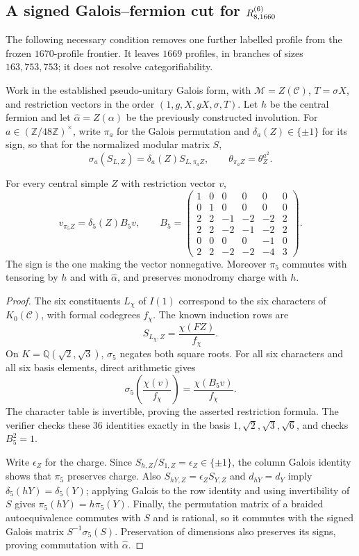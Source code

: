 \subsection{A signed Galois--fermion cut for \texorpdfstring{$R^{(6)}_{8,1660}$}{R6\_8\_1660}}
\label{subsec:r1660-signed-galois}
The following necessary condition removes one further labelled profile from
 the frozen $1670$-profile frontier.  It leaves $1669$ profiles, in branches
of sizes $163,753,753$; it does not resolve categorifiability.

Work in the established pseudo-unitary Galois form, with
$\mathcal M=Z(\mathcal C)$, $T=\sigma X$, and restriction vectors in the
order $(1,g,X,gX,\sigma,T)$.  Let $h$ be the central fermion and let
$\widehat\alpha=Z(\alpha)$ be the previously constructed involution.
For $a\in(\mathbb Z/48\mathbb Z)^\times$, write $\pi_a$ for the Galois
permutation and $\delta_a(Z)\in\{\pm1\}$ for its sign, so that for the
normalized modular matrix $S$,
\[
 \sigma_a(S_{L,Z})=\delta_a(Z)S_{L,\pi_a Z},
 \qquad \theta_{\pi_a Z}=\theta_Z^{a^2}.
\]

\begin{lemma}
For every central simple $Z$ with restriction vector $v$,
\[
 v_{\pi_5 Z}=\delta_5(Z)B_5v,\qquad
 B_5=\begin{pmatrix}
1&0&0&0&0&0\\
0&1&0&0&0&0\\
2&2&-1&-2&-2&2\\
2&2&-2&-1&-2&2\\
0&0&0&0&-1&0\\
2&2&-2&-2&-4&3
\end{pmatrix}.
\]
The sign is the one making the vector nonnegative.  Moreover $\pi_5$
commutes with tensoring by $h$ and with $\widehat\alpha$, and preserves
monodromy charge with $h$.
\end{lemma}
\begin{proof}
The six constituents $L_\chi$ of $I(1)$ correspond to the six characters
of $K_0(\mathcal C)$, with formal codegrees $f_\chi$.  The known induction
rows are
\[
 S_{L_\chi,Z}=\frac{\chi(FZ)}{f_\chi}.
\]
On $K=\mathbb Q(\sqrt2,\sqrt3)$, $\sigma_5$ negates both square roots.
For all six characters and all six basis elements, direct arithmetic gives
\[
 \sigma_5\!\left(\frac{\chi(v)}{f_\chi}\right)
       =\frac{\chi(B_5v)}{f_\chi}.
\]
The character table is invertible, proving the asserted restriction formula.
The verifier checks these $36$ identities exactly in the basis
$1,\sqrt2,\sqrt3,\sqrt6$, and checks $B_5^2=1$.

Write $\epsilon_Z$ for the charge.  Since
$S_{h,Z}/S_{1,Z}=\epsilon_Z\in\{\pm1\}$, the column Galois identity
shows that $\pi_5$ preserves charge.  Also
$S_{hY,Z}=\epsilon_ZS_{Y,Z}$ and $d_{hY}=d_Y$ imply
$\delta_5(hY)=\delta_5(Y)$; applying Galois to the row identity and
using invertibility of $S$ gives $\pi_5(hY)=h\pi_5(Y)$.
Finally, the permutation matrix of a braided autoequivalence commutes with
$S$ and is rational, so it commutes with the signed Galois matrix
$S^{-1}\sigma_5(S)$.  Preservation of dimensions also preserves its signs,
proving commutation with $\widehat\alpha$.
\end{proof}

